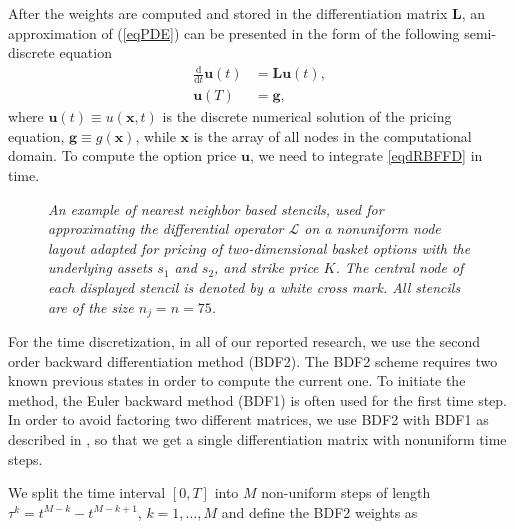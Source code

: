 \documentclass{UUThesisTemplate}
\begin{document}
\par
After the weights are computed and stored in the differentiation matrix $\mathbf{L}$, an approximation of (\ref{eqPDE}) can be presented in the form of the following semi-discrete equation
\begin{align}
\label{eqdRBFFD}
\frac{\mathrm{d}}{\mathrm{d} t}\mathbf{u}(t)&=\mathbf{L}\mathbf{u}(t),\\
\mathbf{u}(T)&=\mathbf{g},
\end{align}
where $\mathbf{u}(t)\equiv u(\mathbf{x},t)$ is the discrete numerical solution of the pricing equation, $\mathbf{g}\equiv g(\mathbf{x})$, while $\mathbf{x}$ is the array of all nodes in the computational domain. To compute the option price $\mathbf{u}$, we need to integrate \eqref{eqdRBFFD} in time. 

\begin{figure}[H]
\centering

\caption{\emph{An example of nearest neighbor based stencils, used for approximating the differential operator $\mathcal{L}$ on a nonuniform node layout adapted for pricing of two-dimensional basket options with the underlying assets $s_1$ and $s_2$, and strike price $K$. The central node of each displayed stencil is denoted by a white cross mark. All stencils are of the size $n_j=n=75$.}}
\label{fig:gridsten}
\end{figure}

\par
For the time discretization, in all of our reported research, we use the second order backward differentiation method (BDF2). The BDF2 scheme requires two known previous states in order to compute the current one. To initiate the method, the Euler backward method (BDF1) is often used for the first time step. In order to avoid factoring two different matrices, we use BDF2 with BDF1 as described in \cite{larsson2008multi}, so that we get a single differentiation matrix with nonuniform time steps.

\par
We split the time interval $[0,T]$ into $M$ non-uniform steps of length $\tau^{k} = t^{M-k}-t^{M-k+1}$, $k = 1,\ldots,M$ and define the BDF2 weights as %
\end{document}
